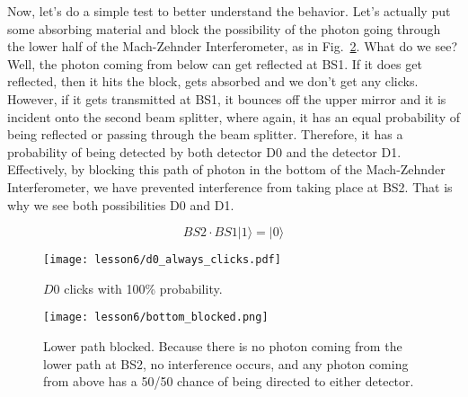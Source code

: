 Now, let's do a simple test to better understand the behavior. Let's actually put some absorbing material and block the possibility of the photon going through the lower half of the Mach-Zehnder Interferometer, as in Fig.~\ref{fig:m-z-blocked}. What do we see? Well, the photon coming from below can get reflected at BS1. If it does get reflected, then it hits the block, gets absorbed and we don't get any clicks. However, if it gets transmitted at BS1, it bounces off the upper mirror and it is incident onto the second beam splitter, where again, it has an equal probability of being reflected or passing through the beam splitter. Therefore, it has a probability of being detected by both detector D0 and the detector D1. Effectively, by blocking this path of photon in the bottom of the Mach-Zehnder Interferometer, we have prevented interference from taking place at BS2. That is why we see both possibilities D0 and D1.

\begin{equation}
B S 2 \cdot B S 1|1\rangle=|0\rangle
\end{equation}
\fi

\begin{figure}[H]
   \centering
    \texttt{[image: lesson6/d0\_always\_clicks.pdf]}
    
        \caption{$D0$ clicks with 100\% probability.}
    \label{fig:m-z-d0}
    
\end{figure}

\begin{figure}[H]
   \centering
    \texttt{[image: lesson6/bottom\_blocked.png]}
    
        \caption[Lower path blocked.]{Lower path blocked. Because there is no photon coming from the lower path at BS2, no interference occurs, and any photon coming from above has a 50/50 chance of being directed to either detector.}
    \label{fig:m-z-blocked}
    
\end{figure}


\newpage
\begin{exercises}



\end{exercises}

